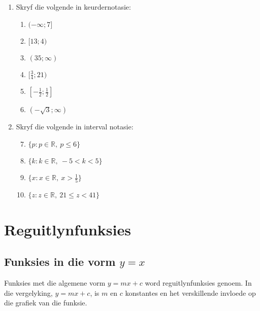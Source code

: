 \begin{exercises}{}
{
\begin{enumerate}[noitemsep, label=\textbf{\arabic*}. ] 
\item Skryf die volgende in keurdernotasie:
\begin{enumerate}[noitemsep, label=\textbf{(\alph*)} ] 
 \item $(-\infty; 7]$
\item $[13; 4)$
\item $(35; \infty)$
\item $[\frac{3}{4}; 21)$
\item $[-\frac{1}{2}; \frac{1}{2}]$
\item $(-\sqrt{3}; \infty)$
\end{enumerate}
\item Skryf die volgende in interval notasie:
\begin{enumerate}[noitemsep, label=\textbf{(\alph*)} ] 
\setcounter{enumi}{6}
 \item $\{p: p \in \mathbb{R},~ p \leq 6\}$
 \item $\{k: k \in \mathbb{R},~ -5 < k < 5\}$
 \item $\{x: x \in \mathbb{R},~ x > \frac{1}{5}\}$
 \item $\{z: z \in \mathbb{R},~ 21 \leq z < 41\}$
\end{enumerate}
\end{enumerate}
} 
\end{exercises}

\section{Reguitlynfunksies}


\subsection*{Funksies in die vorm $y = x$}       
Funksies met die algemene vorm $y=mx+c$ word reguitlynfunksies genoem. In die vergelyking, $y=mx+c$, is $m$ en $c$ konstantes en het verskillende invloede op die grafiek van die funksie. 
\par
{}

